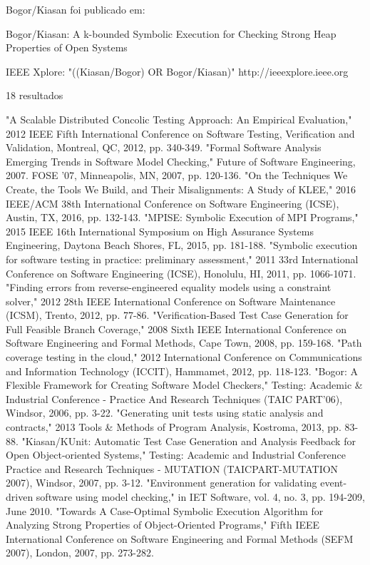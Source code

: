 Bogor/Kiasan foi publicado em:

Bogor/Kiasan: A k-bounded Symbolic Execution for Checking Strong Heap Properties of Open Systems

IEEE Xplore: "((Kiasan/Bogor) OR Bogor/Kiasan)"
http://ieeexplore.ieee.org

18 resultados

"A Scalable Distributed Concolic Testing Approach: An Empirical Evaluation," 2012 IEEE Fifth International Conference on Software Testing, Verification and Validation, Montreal, QC, 2012, pp. 340-349.
"Formal Software Analysis Emerging Trends in Software Model Checking," Future of Software Engineering, 2007. FOSE '07, Minneapolis, MN, 2007, pp. 120-136.
"On the Techniques We Create, the Tools We Build, and Their Misalignments: A Study of KLEE," 2016 IEEE/ACM 38th International Conference on Software Engineering (ICSE), Austin, TX, 2016, pp. 132-143.
"MPISE: Symbolic Execution of MPI Programs," 2015 IEEE 16th International Symposium on High Assurance Systems Engineering, Daytona Beach Shores, FL, 2015, pp. 181-188.
"Symbolic execution for software testing in practice: preliminary assessment," 2011 33rd International Conference on Software Engineering (ICSE), Honolulu, HI, 2011, pp. 1066-1071.
"Finding errors from reverse-engineered equality models using a constraint solver," 2012 28th IEEE International Conference on Software Maintenance (ICSM), Trento, 2012, pp. 77-86.
"Verification-Based Test Case Generation for Full Feasible Branch Coverage," 2008 Sixth IEEE International Conference on Software Engineering and Formal Methods, Cape Town, 2008, pp. 159-168.
"Path coverage testing in the cloud," 2012 International Conference on Communications and Information Technology (ICCIT), Hammamet, 2012, pp. 118-123.
"Bogor: A Flexible Framework for Creating Software Model Checkers," Testing: Academic & Industrial Conference - Practice And Research Techniques (TAIC PART'06), Windsor, 2006, pp. 3-22.
"Generating unit tests using static analysis and contracts," 2013 Tools & Methods of Program Analysis, Kostroma, 2013, pp. 83-88.
"Kiasan/KUnit: Automatic Test Case Generation and Analysis Feedback for Open Object-oriented Systems," Testing: Academic and Industrial Conference Practice and Research Techniques - MUTATION (TAICPART-MUTATION 2007), Windsor, 2007, pp. 3-12.
"Environment generation for validating event-driven software using model checking," in IET Software, vol. 4, no. 3, pp. 194-209, June 2010.
"Towards A Case-Optimal Symbolic Execution Algorithm for Analyzing Strong Properties of Object-Oriented Programs," Fifth IEEE International Conference on Software Engineering and Formal Methods (SEFM 2007), London, 2007, pp. 273-282.
